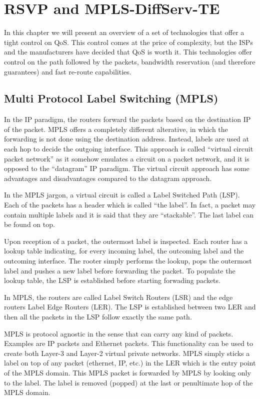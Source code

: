 \chapter{RSVP and MPLS-DiffServ-TE}

In this chapter we will present an overview of a set of technologies that offer a tight control on QoS.
This control comes at the price of complexity, but the ISPs and the manufacturers have decided that QoS is worth it.
This technologies offer control on the path followed by the packets, bandwidth reservation (and therefore guarantees) and fast re-route capabilities.

\section{Multi Protocol Label Switching (MPLS)}

In the IP paradigm, the routers forward the packets based on the destination IP of the packet.
MPLS offers a completely different alterative, in which the forwarding is not done using the destination address.
Instead, labels are used at each hop to decide the outgoing interface.
This approach is called ``virtual circuit packet network'' as it somehow emulates a circuit on a packet network, and it is opposed to the ``datagram'' IP paradigm.
The virtual circuit approach has some advantages and disadvantages compared to the datagram approach.

In the MPLS jargon, a virtual circuit is called a Label Switched Path (LSP).
Each of the packets has a header which is called ``the label''.
In fact, a packet may contain multiple labels and it is said that they are ``stackable''.
The last label can be found on top.

Upon reception of a packet, the outermost label is inspected.
Each router has a lookup table indicating, for every incoming label, the outcoming label and the outcoming interface.
The rooter simply performs the lookup, pops the outermost label and pushes a new label before forwarding the packet.
To populate the lookup table, the LSP is established before starting forwading packets.

In MPLS, the routers are called Label Switch Routers (LSR) and the edge routers Label Edge Routers (LER).
The LSP is established between two LER and then all the packets in the LSP follow exactly the same path.

MPLS is protocol agnostic in the sense that can carry any kind of packets.
Examples are IP packets and Ethernet packets.
This functionality can be used to create both Layer-3 and Layer-2 virtual private networks.
MPLS simply sticks a label on top of any packet (ethernet, IP, etc.)  in the LER which is the entry point of the MPLS domain.
This MPLS packet is forwarded by MPLS by looking only to the label.
The label is removed (popped) at the last or penultimate hop of the MPLS domain.

